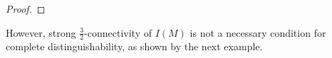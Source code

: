 \begin{proof}

\end{proof}

However, strong $\frac{3}{2}$-connectivity of $I(M)$ is not a necessary
condition for complete distinguishability, as shown by the next example.


